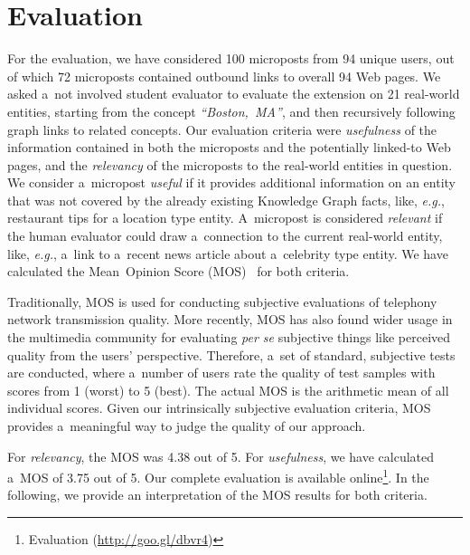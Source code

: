 \documentclass[runningheads,a4paper]{llncs}
\begin{document}
\section{Evaluation}
For the evaluation, we have considered 100 microposts from 94 unique users,
out of which 72 microposts contained outbound links to overall 94 Web pages.
We asked a~not involved student evaluator
to evaluate the extension on 21 real-world entities, starting from the concept
\emph{``Boston,~MA''}, and then recursively following graph links to related concepts.
Our evaluation criteria were \emph{usefulness} of the information
contained in both the microposts and the potentially linked-to Web pages,
and the \emph{relevancy} of the microposts to the real-world entities in question.
We consider a~micropost \emph{useful} if it provides additional information on an entity
that was not covered by the already existing Knowledge Graph facts, like, \emph{e.g.},
restaurant tips for a location type entity.
A~micropost is considered \emph{relevant} if the human evaluator could draw a~connection
to the current real-world entity, like, \emph{e.g.},
a~link to a~recent news article about a~celebrity type entity.
We have calculated the Mean~Opinion Score (MOS)~\cite{mos1998} for both criteria.

Traditionally, MOS is used for conducting subjective evaluations
of telephony network transmission quality. More recently, MOS has also found wider usage in the multimedia community
for evaluating \emph{per se} subjective things
like perceived quality from the users' perspective.
Therefore, a~set of standard, subjective tests are conducted,
where a~number of users rate the quality of test samples
with scores from 1 (worst) to 5 (best).
The actual MOS is the arithmetic mean of all individual scores.
Given our intrinsically subjective evaluation criteria,
MOS provides a~meaningful way to judge the quality of our approach.

For \emph{relevancy}, the MOS was 4.38 out of 5.
For \emph{usefulness}, we have calculated a~MOS of 3.75 out of 5.
Our complete evaluation is available online\footnote{Evaluation (\url{http://goo.gl/dbvr4})}.
In the following, we provide an interpretation of the MOS results for both criteria.

\vspace{-0.7em}
\end{document}
